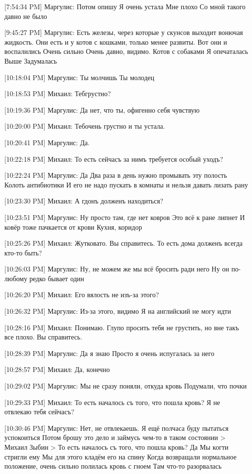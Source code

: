 \documentclass{article}
\newcommand{\yat}{{\fontencoding{X2}\selectfont\cyryat}} %
\begin{document}
{[7:54:34 PM] Маргулис:
Потом опишу
 Я очень устала
 Мне плохо
 Со мной такого давно не было

[9:45:27 PM] Маргулис:
Есть железы, через которые у скунсов выходит вонючая жидкость. Они есть и у котов с кошками, только менее развиты. Вот они и воспалились
 Очень сильно
 Очень давно, видимо.
 Котов с собаками
 Я опечаталась
 Выше
 Задумалась

[10:18:04 PM] Маргулис:
Ты молчишь
 Ты молодец

[10:18:53 PM] Михаил:
Теб\yat грустно?

[10:19:36 PM] Маргулис:
Да нет, что ты, офигенно себя чувствую

[10:20:00 PM] Михаил:
Теб\yat очень грустно и ты устала.

[10:20:41 PM] Маргулис:
Да.

[10:22:18 PM] Михаил:
То есть сейчасъ за нимъ требуется особый уходъ?

[10:22:24 PM] Маргулис:
Да
 Два раза в день нужно промывать эту полость
 Колоть антибиотики
 И его не надо пускать в комнаты и нельзя давать лизать рану

[10:23:30 PM] Михаил:
А гд\yat онъ долженъ находиться?

[10:23:51 PM] Маргулис:
Ну просто там, где нет ковров
 Это всё к ране липнет
 И ковёр тоже пачкается от крови
 Кухня, коридор

[10:25:26 PM] Михаил:
Жутковато. Вы справитесь. То есть дома долженъ всегда кто-то быть?

[10:26:03 PM] Маргулис:
Ну, не можем же мы всё бросить ради него
 Ну он по-любому редко бывает один

[10:26:20 PM] Михаил:
Его вялость не изъ-за этого?

[10:26:32 PM] Маргулис:
Из-за этого, видимо
 Я на английский не могу идти

[10:28:16 PM] Михаил:
Понимаю. Глупо просить тебя не грустить, но в не такъ все плохо. Вы справитесь.

[10:28:39 PM] Маргулис:
Да я знаю
 Просто я очень испугалась за него

[10:28:57 PM] Михаил:
Да, конечно

[10:29:02 PM] Маргулис:
Мы не сразу поняли, откуда кровь
 Подумали, что почки

[10:29:33 PM] Михаил:
То есть началось съ того, что пошла кровь?
 Я не отвлекаю тебя сейчасъ?

[10:30:46 PM] Маргулис:
Нет, не отвлекаешь. Я ещё полчаса буду пытаться успокоиться
 Потом брошу это дело и займусь чем-то в таком состоянии
> Михаил Зыбин
> То есть началось съ того, что пошла кровь?
Да
 Мы когти стригли ему
 Мы для этого кладём его на спину
 Когда возвращали нормальное положение, очень сильно полилась кровь с гноем
 Там что-то разорвалась

}
\end{document}

